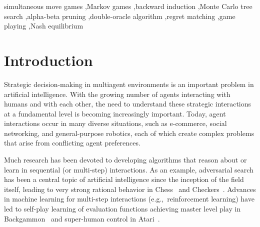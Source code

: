 \documentclass[preprint,12pt]{elsarticle}
\newcommand{\eg}{{e.g.,}~}
\newcounter{mlNoteCounter}
\newcounter{bbNoteCounter}
\newcommand{\mlanctot}[1]{{\small \color{darkgreen} $\blacksquare$ \refstepcounter{mlNoteCounter}\textsf{[ML]$_{\arabic{mlNoteCounter}}$:{#1}}}}
\newcommand{\bbosansky}[1]{{\small \color{orange} $\blacktriangle$ \refstepcounter{bbNoteCounter}\textsf{[BB]$_{\arabic{bbNoteCounter}}$:{#1}}}}
\begin{document}
\begin{frontmatter}
\begin{keyword}
simultaneous move games \sep Markov games \sep backward induction \sep Monte Carlo tree search \sep alpha-beta pruning \sep double-oracle algorithm \sep regret matching \sep game playing \sep Nash equilibrium

\end{keyword}

\end{frontmatter}





\section{Introduction}
\label{sec:intro}

Strategic decision-making in multiagent environments is an important problem in artificial intelligence.
With the growing number of agents interacting with humans and with each other, the need to
understand these strategic interactions at a fundamental level is becoming increasingly important.
Today, agent interactions occur in many diverse situations, such as e-commerce, social networking, and
general-purpose robotics, each of which create complex problems that arise from conflicting agent
preferences.

Much research has been devoted to developing algorithms that reason about or learn in sequential (or multi-step)
interactions. As an example, adversarial search has been a central topic of artificial intelligence
since the inception of the field itself, leading to very strong rational behavior in
Chess~\cite{Campbell02deepblue} and Checkers~\cite{Schaeffer96chinook}. Advances in machine learning for multi-step interactions
(\eg reinforcement learning) have led to self-play learning of evaluation functions achieving master level play
in Backgammon~\cite{Tesauro95TDGammon} and super-human control in Atari~\cite{mnih-atari-2013,mnih-dqn-2015}.
\end{document}
